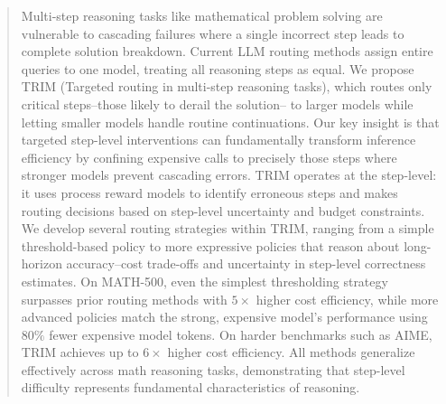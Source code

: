 \documentclass{article}
\theoremstyle{plain}
\theoremstyle{definition}
\theoremstyle{remark}
\begin{document}

\begin{abstract}
Multi-step reasoning tasks like mathematical problem solving are vulnerable to cascading failures where a single incorrect step leads to complete solution breakdown. Current LLM routing methods assign entire queries to one model, treating all reasoning steps as equal. We propose TRIM (Targeted routing in multi-step reasoning tasks), which routes only critical steps--those likely to derail the solution--
to larger models while letting smaller models handle routine continuations. Our key insight is that targeted step-level interventions can fundamentally transform inference efficiency by confining expensive calls to precisely those steps where stronger models prevent cascading errors. 
TRIM operates at the step-level: it uses process reward models to identify erroneous steps and makes routing decisions based on step-level uncertainty and budget constraints. 
We develop several routing strategies within TRIM, ranging from a simple threshold-based policy to more expressive policies that reason about long-horizon accuracy–cost trade-offs and uncertainty in step-level correctness estimates.
On MATH-500, even the simplest thresholding strategy surpasses prior routing methods with $5\times$ higher cost efficiency, while more advanced policies match the strong, expensive model’s performance using $80\%$ fewer expensive model tokens. On harder benchmarks such as AIME, TRIM achieves up to $6\times$ higher cost efficiency. All methods generalize effectively across math reasoning tasks, demonstrating that step-level difficulty represents fundamental characteristics of reasoning.
\end{abstract}
\end{document}
